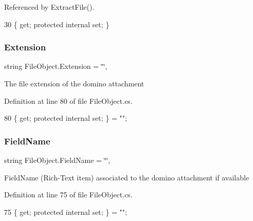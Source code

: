 Referenced by Extract\+File().


\begin{DoxyCode}
30 \{ \textcolor{keyword}{get}; \textcolor{keyword}{protected} \textcolor{keyword}{internal} \textcolor{keyword}{set}; \}
\end{DoxyCode}
\mbox{\label{class_file_object_ae25b58dc19def323da91a48e17ba13ed}} 
\subsubsection{\texorpdfstring{Extension}{Extension}}
{\footnotesize\ttfamily string File\+Object.\+Extension = \char`\"{}\char`\"{}\hspace{0.3cm}{\ttfamily [get]}, {\ttfamily [set]}}



The file extension of the domino attachment 



Definition at line 80 of file File\+Object.\+cs.


\begin{DoxyCode}
80 \{ \textcolor{keyword}{get}; \textcolor{keyword}{protected} \textcolor{keyword}{internal} \textcolor{keyword}{set}; \} = \textcolor{stringliteral}{""};
\end{DoxyCode}
\mbox{\label{class_file_object_a26fa0ac628fee2387b7f89c78f93842e}} 
\subsubsection{\texorpdfstring{Field\+Name}{FieldName}}
{\footnotesize\ttfamily string File\+Object.\+Field\+Name = \char`\"{}\char`\"{}\hspace{0.3cm}{\ttfamily [get]}, {\ttfamily [set]}}



Field\+Name (Rich-\/\+Text item) associated to the domino attachment if available 



Definition at line 75 of file File\+Object.\+cs.


\begin{DoxyCode}
75 \{ \textcolor{keyword}{get}; \textcolor{keyword}{protected} \textcolor{keyword}{internal} \textcolor{keyword}{set}; \} = \textcolor{stringliteral}{""};
\end{DoxyCode}
\mbox{\label{class_file_object_a36ff6c07d0662885402bfe7d98cf2988}} 
